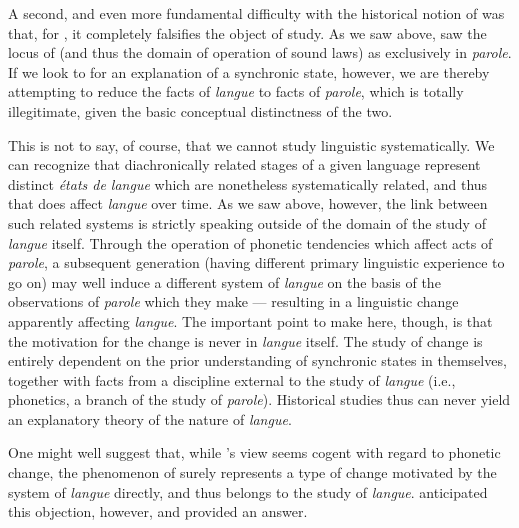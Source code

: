 A second, and even more fundamental difficulty with the historical
notion of  was that, for {\Saussure}, it completely falsifies
the object of study.  As we saw above, {\Saussure} saw the locus of
 (and thus the domain of operation of sound laws) as
exclusively in \emph{parole}.  If we look to  for
an {explanation} of a synchronic state, however, we are thereby
attempting to reduce the facts of \emph{langue} to facts of
\emph{parole}, which is totally illegitimate, given the basic
conceptual distinctness of the two.

This is not to say, of course, that we cannot study linguistic 
systematically.  We can recognize that diachronically related stages
of a given language represent distinct \emph{états de langue}
which are nonetheless systematically related, and thus that 
does affect \emph{langue} over time.  As we saw above, however,
the link between such related systems is strictly speaking outside of
the domain of the study of \emph{langue} itself.  Through the
operation of phonetic tendencies which affect acts of
\emph{parole}, a subsequent generation (having different primary
linguistic experience to go on) may well induce a different system of
\emph{langue} on the basis of the observations of \emph{parole}
which they make --- resulting in a linguistic {change} apparently
affecting \emph{langue}.  The important point to make here,
though, is that the motivation for the {change} is never in
\emph{langue} itself.  The study of {change} is entirely dependent
on the prior understanding of synchronic states in themselves,
together with facts from a discipline external to the study of
\emph{langue} (i.e., phonetics, a branch of the study of
\emph{parole}).  Historical studies thus can never yield an
explanatory theory of the nature of \emph{langue}.

One might well suggest that, while {\Saussure}'s view seems cogent with
regard to phonetic {change}, the phenomenon of  surely represents
a type of {change} motivated by the system of \emph{langue} directly,
and thus belongs to the study of \emph{langue}.  {\Saussure} anticipated
this objection, however, and provided an answer.

